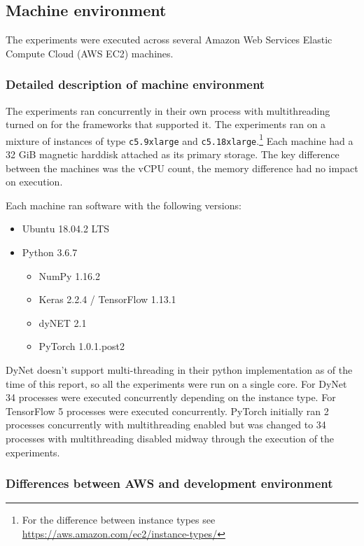 \subsection{Machine environment}

The experiments were executed across several Amazon Web Services Elastic Compute
Cloud (AWS EC2) machines.

\subsubsection{Detailed description of machine environment}

The experiments ran concurrently in their own process with multithreading
turned on for the frameworks that supported it. The experiments ran on a
mixture of instances of type \texttt{c5.9xlarge} and
\texttt{c5.18xlarge}.\footnote{For the difference between instance types see
\url{https://aws.amazon.com/ec2/instance-types/}}
Each machine had a 32 GiB magnetic harddisk attached as its primary storage.
The key difference between the machines was the vCPU count, the memory
difference had no impact on execution.

Each machine ran software with the following versions:
\begin{itemize}
  \item{Ubuntu 18.04.2 LTS}
  \item{Python 3.6.7}
  \begin{itemize}
    \item{NumPy 1.16.2}
    \item{Keras 2.2.4 / TensorFlow 1.13.1}
    \item{dyNET 2.1}
    \item{PyTorch 1.0.1.post2}
  \end{itemize}
\end{itemize}

DyNet doesn't support multi-threading in their python implementation as of the
time of this report, so all the experiments were run on a single core. 
For DyNet 34 processes were executed concurrently depending on the
instance type.
For TensorFlow 5 processes were executed concurrently.
PyTorch initially ran 2 processes concurrently with multithreading enabled but
was changed to 34 processes with multithreading disabled midway through the
execution of the experiments.

\subsubsection{Differences between AWS and development environment}

